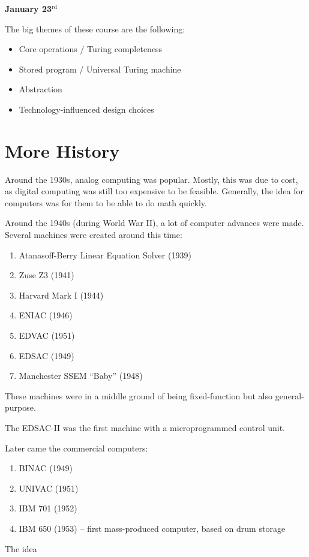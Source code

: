 \setcounter{section}{0}

\textbf{January 23$^{\text{rd}}$}

The big themes of these course are the following:
\begin{itemize}
    \item Core operations / Turing completeness
    \item Stored program / Universal Turing machine
    \item Abstraction
    \item Technology-influenced design choices
\end{itemize}

\section{More History}
Around the 1930s, analog computing was popular.
Mostly, this was due to cost, as digital computing was still too expensive to be feasible.
Generally, the idea for computers was for them to be able to do math quickly.

Around the 1940s (during World War II), a lot of computer advances were made.
Several machines were created around this time:
\begin{enumerate}
    \item Atanasoff-Berry Linear Equation Solver (1939)
    \item Zuse Z3 (1941)
    \item Harvard Mark I (1944)
    \item ENIAC (1946)
    \item EDVAC (1951)
    \item EDSAC (1949)
    \item Manchester SSEM ``Baby'' (1948)
\end{enumerate}
These machines were in a middle ground of being fixed-function but also general-purpose.

The EDSAC-II was the first machine with a microprogrammed control unit.


Later came the commercial computers:
\begin{enumerate}
    \item BINAC (1949)
    \item UNIVAC (1951)
    \item IBM 701 (1952)
    \item IBM 650 (1953) -- first mass-produced computer, based on drum storage
\end{enumerate}
The idea 

